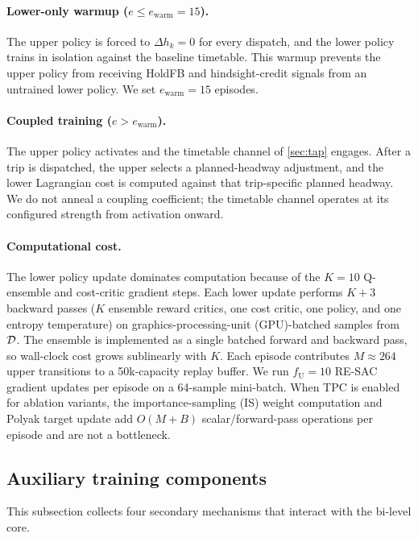 \paragraph{Lower-only warmup ($e \leq e_{\mathrm{warm}} = 15$).}
The upper policy is forced to $\Delta h_k = 0$ for every dispatch, and the lower policy trains in isolation against the baseline timetable. This warmup prevents the upper policy from receiving HoldFB and hindsight-credit signals from an untrained lower policy. We set $e_{\mathrm{warm}} = 15$ episodes.

\paragraph{Coupled training ($e > e_{\mathrm{warm}}$).}
The upper policy activates and the timetable channel of \cref{sec:tap} engages. After a trip is dispatched, the upper selects a planned-headway adjustment, and the lower Lagrangian cost is computed against that trip-specific planned headway. We do not anneal a coupling coefficient; the timetable channel operates at its configured strength from activation onward.

\paragraph{Computational cost.}
The lower policy update dominates computation because of the $K{=}10$ Q-ensemble and cost-critic gradient steps.
Each lower update performs $K{+}3$ backward passes ($K$ ensemble reward critics, one cost critic, one policy, and one entropy temperature) on graphics-processing-unit (GPU)-batched samples from $\mathcal{D}$. The ensemble is implemented as a single batched forward and backward pass, so wall-clock cost grows sublinearly with $K$.
Each episode contributes $M \approx 264$ upper transitions to a 50k-capacity replay buffer. We run $f_{\mathrm{U}} = 10$ RE-SAC gradient updates per episode on a 64-sample mini-batch.
When TPC is enabled for ablation variants, the importance-sampling (IS) weight computation and Polyak target update add $O(M + B)$ scalar/forward-pass operations per episode and are not a bottleneck.

\subsection{Auxiliary training components}
\label{sec:aux}

This subsection collects four secondary mechanisms that interact with the bi-level core.

